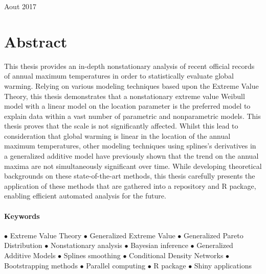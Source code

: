 \documentclass[11pt,a4paper,openany, twosided]{book}
\begin{document}
\vspace{1,5cm}



\begin{center}
	{\large Aout 2017}
\end{center}
\thispagestyle{empty}
\newpage


{}
\vspace*{\fill}
\section*{\centering Abstract}
\begin{tcolorbox}%
This thesis provides an in-depth nonstationary analysis of recent official records of annual maximum temperatures in order to statistically evaluate global warming. Relying on various modeling techniques based upon the Extreme Value Theory, this thesis demonstrates that a nonstationary extreme value Weibull model with a linear model on the location parameter is the preferred model to explain data within a vast number of parametric and nonparametric models. This thesis proves that the scale is not significantly affected. Whilst this lead  to consideration that global warming is linear in the location of the annual maximum temperatures, other modeling techniques using splines's derivatives in a generalized additive model have previously shown that the trend on the annual maxima are not simultaneously significant over time.
While developing theoretical backgrounds on these state-of-the-art methods, this thesis carefully presents the application of these methods that are gathered into a repository and R package, enabling efficient automated analysis for the future.

\thispagestyle{empty}
\end{tcolorbox}

\vspace{.3cm}

\paragraph*{Keywords} $\bullet$ Extreme Value Theory   $\bullet$ Generalized Extreme Value  $\bullet$ Generalized Pareto Distribution $\bullet$ Nonstationary analysis $\bullet$ Bayesian inference   $\bullet$ Generalized Additive Models $\bullet$ Splines smoothing  $\bullet$ Conditional Density Networks $\bullet$ Bootstrapping methods $\bullet$ Parallel computing $\bullet$ R package $\bullet$ Shiny applications
\vspace*{\fill}
\end{document}
